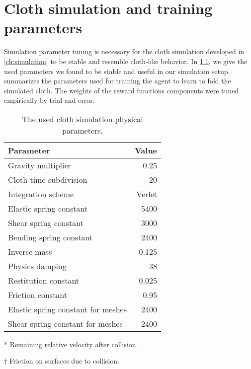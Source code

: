 \documentclass[\home/main.tex]{subfiles}
\begin{document}
\chapter{Cloth simulation and training parameters}\label{appx:cloth_sim_params}
Simulation parameter tuning is necessary for the cloth simulation developed in \cref{ch:simulation} to be stable and resemble cloth-like behavior. In \cref{table:cloth_sim_params}, we give the used parameters we found to be stable and useful in our simulation setup.  summarizes the parameters used for training the agent to learn to fold the simulated cloth. The weights of the reward functions components were tuned empirically by trial-and-error.

\begin{table}[htb]
  \centering
  \begin{threeparttable}
    \caption{The used cloth simulation physical parameters.}
    \begin{tabular}[t]{@{} l r @{}}
      \toprule
      Parameter                          & Value  \\
      \midrule

      Gravity multiplier                 & 0.25   \\
      Cloth time subdivision             & 20     \\
      Integration scheme                 & Verlet \\
      Elastic spring constant            & 5400   \\
      Shear spring constant              & 3000   \\
      Bending spring constant            & 2400   \\
      Inverse mass                       & 0.125  \\
      Physics damping                    & 38     \\
      Restitution constant\tnote{*}      & 0.025  \\
      Friction constant\tnote{$\dagger$} & 0.95   \\
      Elastic spring constant for meshes & 2400   \\
      Shear spring constant for meshes   & 2400   \\

      \bottomrule
    \end{tabular}
    \begin{tablenotes}\footnotesize
      \item[*] Remaining relative velocity after collision.
      \item[$\dagger$] Friction on surfaces due to collision.
    \end{tablenotes}

    \label{table:cloth_sim_params}
  \end{threeparttable}
\end{table}
\end{document}
